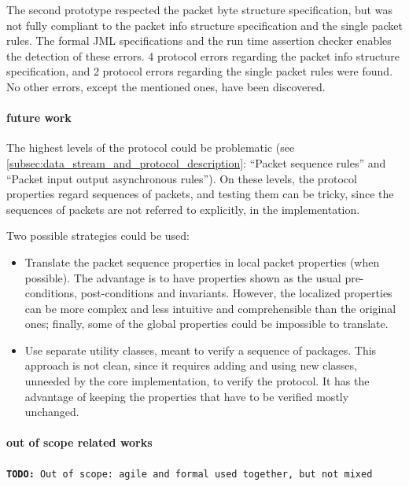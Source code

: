 \documentclass{article}
\newcommand{\todo}[1]{\texttt{\textbf{TODO:} #1}}
\begin{document}
The second prototype respected the packet byte structure specification, but was not fully compliant to the packet info structure specification and the single packet rules.
The formal JML specifications and the run time assertion checker enables the detection of these errors.
4 protocol errors regarding the packet info structure specification, and 2 protocol errors regarding the single packet rules were found. 
No other errors, except the mentioned ones, have been discovered.

\paragraph*{future work}

The highest levels of the protocol could be problematic (see \ref{subsec:data_stream_and_protocol_description}: ``Packet sequence rules'' and ``Packet input output asynchronous rules''). 
On these levels, the protocol properties regard sequences of packets, and testing them can be tricky, since the sequences of packets are not referred to explicitly, in the implementation.  

Two possible strategies could be used:
\begin{itemize}
\item Translate the packet sequence properties in local packet properties (when possible).  
The advantage is to have properties shown as the usual pre-conditions, post-conditions and invariants.  
However, the localized properties can be more complex and less intuitive and comprehensible than the original ones; finally, some of the global properties could be impossible to translate.
\item Use separate utility classes, meant to verify a sequence of packages.  
This approach is not clean, since it requires adding and using new classes, unneeded by the core implementation, to verify the protocol.  It has the advantage of keeping the properties that have to be verified mostly unchanged.
\end{itemize}

\paragraph*{out of scope related works}

\todo{Out of scope: agile and formal used together, but not mixed}
\end{document}
